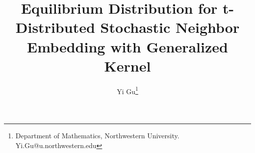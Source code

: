 \documentclass[10pt]{article}
\author{Yi Gu\footnote{Department of Mathematics, Northwestern University. Yi.Gu@u.northwestern.edu}}
\begin{document}
\title{Equilibrium Distribution for t-Distributed Stochastic Neighbor Embedding with Generalized Kernel}
\maketitle

\tableofcontents


\nocite{*}

\end{document}
